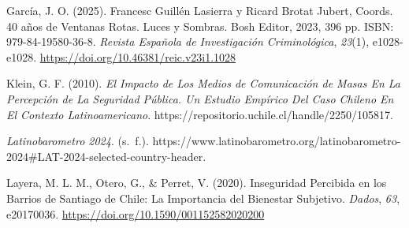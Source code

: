 \documentclass[
  spanish,
  a4paper,
  oneside]{scrbook}
\newlength{\cslhangindent}
\newenvironment{CSLReferences}[2] %
 {\begin{list}{}{%
  \setlength{\itemindent}{0pt}
  \setlength{\leftmargin}{0pt}
  \setlength{\parsep}{0pt}
  \ifodd #1
   \setlength{\leftmargin}{\cslhangindent}
   \setlength{\itemindent}{-1\cslhangindent}
  \fi
  \setlength{\itemsep}{#2\baselineskip}}}
 {\end{list}}
\begin{document}
\protect{}\label{refs}
\begin{CSLReferences}{1}{0}
García, J. O. (2025). {Francesc Guillén Lasierra y Ricard Brotat Jubert,
Coords. 40 años de Ventanas Rotas. Luces y Sombras. Bosh Editor, 2023,
396 pp. ISBN: 979-84-19580-36-8}. \emph{Revista Española de
Investigación Criminológica}, \emph{23}(1), e1028-e1028.
\url{https://doi.org/10.46381/reic.v23i1.1028}

Klein, G. F. (2010). \emph{El Impacto de Los Medios de Comunicación de
Masas En La Percepción de La Seguridad Pública. Un Estudio Empírico Del
Caso Chileno En El Contexto Latinoamericano}.
https://repositorio.uchile.cl/handle/2250/105817.

\emph{Latinobarometro 2024}. (s.~f.).
https://www.latinobarometro.org/latinobarometro-2024\#LAT-2024-selected-country-header.

Layera, M. L. M., Otero, G., \& Perret, V. (2020). {Inseguridad
Percibida en los Barrios de Santiago de Chile: La Importancia del
Bienestar Subjetivo}. \emph{Dados}, \emph{63}, e20170036.
\url{https://doi.org/10.1590/001152582020200}

\end{CSLReferences}


\backmatter

\mainmatter
\pagestyle{scrheadings}

\end{document}
